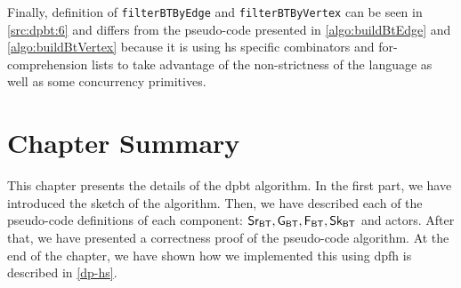 Finally, definition of \texttt{filterBTByEdge} and \texttt{filterBTByVertex} can be seen in \autoref{src:dpbt:6} and differs 
from the pseudo-code presented in \autoref{algo:buildBtEdge} and \autoref{algo:buildBtVertex} because it is using \acrshort{hs} specific combinators and 
for-comprehension lists to take advantage of the non-strictness of the language as well as some concurrency primitives.

\section{Chapter Summary}
This chapter presents the details of the \acrshort{dpbt} algorithm. In the first part, we have introduced the sketch of the algorithm.
Then, we have described each of the pseudo-code definitions of each component: $\mathsf{Sr_{BT}}, \mathsf{G_{BT}}, \mathsf{F_{BT}}, \mathsf{Sk_{BT}}$ and actors. 
After that, we have presented a correctness proof of the pseudo-code algorithm.
At the end of the chapter, we have shown how we implemented this using \acrshort{dpfh} is described in \autoref{dp-hs}.

